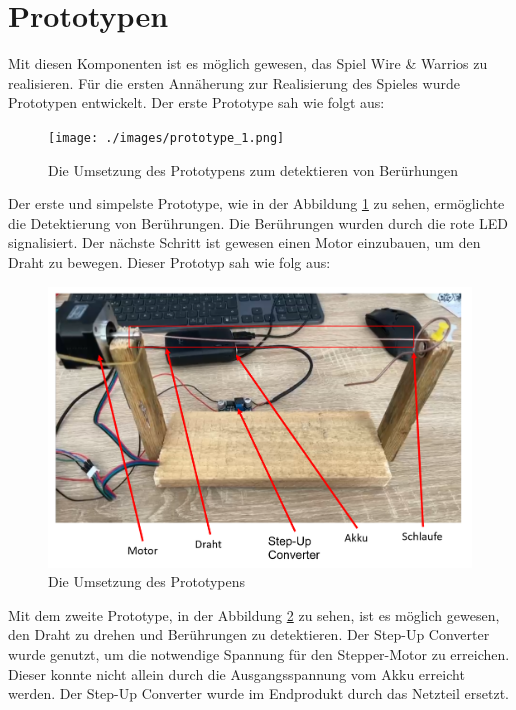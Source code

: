 \section{Prototypen}

Mit diesen Komponenten ist es möglich gewesen, das Spiel Wire \& Warrios zu realisieren. Für die ersten Annäherung zur Realisierung des Spieles wurde Prototypen entwickelt. Der erste Prototype sah wie folgt aus:

\begin{figure}[H]
 \centerline{\texttt{[image: ./images/prototype\_1.png]}}
 \caption{Die Umsetzung des Prototypens zum detektieren von Berürhungen}\label{prototype_1}
\end{figure}

Der erste und simpelste Prototype, wie in der Abbildung \ref{prototype_1} zu sehen, ermöglichte die Detektierung von Berührungen. Die Berührungen wurden durch die rote LED signalisiert. Der nächste Schritt ist gewesen einen Motor einzubauen, um den Draht zu bewegen. Dieser Prototyp sah wie folg aus:


\begin{figure}[H]
 \centerline{\includegraphics[width=\textwidth,scale=1]{./images/prototype_2.png}}
 \caption{Die Umsetzung des Prototypens}\label{prototype}
\end{figure} 

Mit dem zweite Prototype, in der Abbildung \ref{prototype} zu sehen, ist es möglich gewesen, den Draht zu drehen und Berührungen zu detektieren. Der Step-Up Converter wurde genutzt, um die notwendige Spannung für den Stepper-Motor zu erreichen. Dieser konnte nicht allein durch die Ausgangsspannung vom Akku erreicht werden. Der Step-Up Converter wurde im Endprodukt durch das Netzteil ersetzt.

